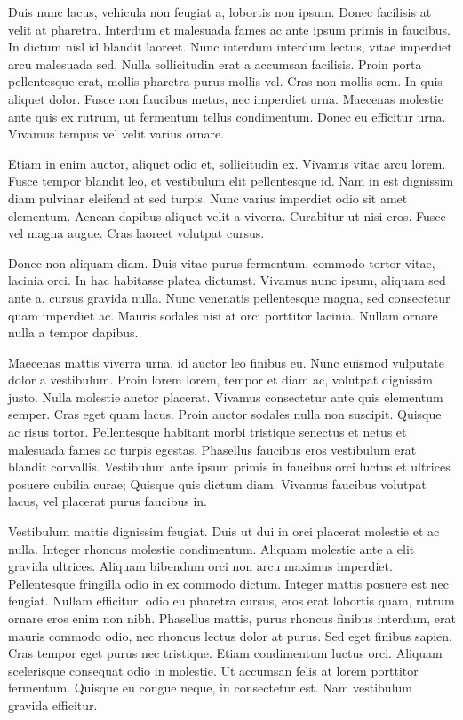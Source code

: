 \documentclass[english,fleqn]{ieej-tec2}%
\begin{document}
{Duis nunc lacus, vehicula non feugiat a, lobortis non ipsum. Donec facilisis at velit at pharetra. Interdum et malesuada fames ac ante ipsum primis in faucibus. In dictum nisl id blandit laoreet. Nunc interdum interdum lectus, vitae imperdiet arcu malesuada sed. Nulla sollicitudin erat a accumsan facilisis. Proin porta pellentesque erat, mollis pharetra purus mollis vel. Cras non mollis sem. In quis aliquet dolor. Fusce non faucibus metus, nec imperdiet urna. Maecenas molestie ante quis ex rutrum, ut fermentum tellus condimentum. Donec eu efficitur urna. Vivamus tempus vel velit varius ornare.

Etiam in enim auctor, aliquet odio et, sollicitudin ex. Vivamus vitae arcu lorem. Fusce tempor blandit leo, et vestibulum elit pellentesque id. Nam in est dignissim diam pulvinar eleifend at sed turpis. Nunc varius imperdiet odio sit amet elementum. Aenean dapibus aliquet velit a viverra. Curabitur ut nisi eros. Fusce vel magna augue. Cras laoreet volutpat cursus.

Donec non aliquam diam. Duis vitae purus fermentum, commodo tortor vitae, lacinia orci. In hac habitasse platea dictumst. Vivamus nunc ipsum, aliquam sed ante a, cursus gravida nulla. Nunc venenatis pellentesque magna, sed consectetur quam imperdiet ac. Mauris sodales nisi at orci porttitor lacinia. Nullam ornare nulla a tempor dapibus.

Maecenas mattis viverra urna, id auctor leo finibus eu. Nunc euismod vulputate dolor a vestibulum. Proin lorem lorem, tempor et diam ac, volutpat dignissim justo. Nulla molestie auctor placerat. Vivamus consectetur ante quis elementum semper. Cras eget quam lacus. Proin auctor sodales nulla non suscipit. Quisque ac risus tortor. Pellentesque habitant morbi tristique senectus et netus et malesuada fames ac turpis egestas. Phasellus faucibus eros vestibulum erat blandit convallis. Vestibulum ante ipsum primis in faucibus orci luctus et ultrices posuere cubilia curae; Quisque quis dictum diam. Vivamus faucibus volutpat lacus, vel placerat purus faucibus in.

Vestibulum mattis dignissim feugiat. Duis ut dui in orci placerat molestie et ac nulla. Integer rhoncus molestie condimentum. Aliquam molestie ante a elit gravida ultrices. Aliquam bibendum orci non arcu maximus imperdiet. Pellentesque fringilla odio in ex commodo dictum. Integer mattis posuere est nec feugiat. Nullam efficitur, odio eu pharetra cursus, eros erat lobortis quam, rutrum ornare eros enim non nibh. Phasellus mattis, purus rhoncus finibus interdum, erat mauris commodo odio, nec rhoncus lectus dolor at purus. Sed eget finibus sapien. Cras tempor eget purus nec tristique. Etiam condimentum luctus orci. Aliquam scelerisque consequat odio in molestie. Ut accumsan felis at lorem porttitor fermentum. Quisque eu congue neque, in consectetur est. Nam vestibulum gravida efficitur.

}
\end{document}
